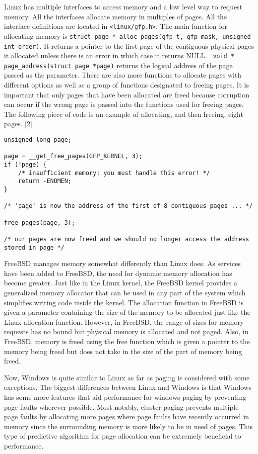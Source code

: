 \documentclass[letterpaper,10pt,onecolumn,draftclsnofoot,]{article}
\begin{document}
Linux has multiple interfaces to access memory and a low level way to request memory. All the interfaces allocate memory in multiples of pages. All the interface definitions are located in \verb|<linux/gfp.h>|. The main function for allocating memory is \verb|struct page * alloc_pages(gfp_t, gfp_mask, unsigned int order)|. It returns a pointer to the first page of the contiguous physical pages it allocated unless there is an error in which case it returns NULL. \verb| void * page_address(struct page *page)| returns the logical address of the page passed as the parameter. There are also more functions to allocate pages with different options as well as a group of functions designated to freeing pages. It is important that only pages that have been allocated are freed because corruption can occur if the wrong page is passed into the functions used for freeing pages. The following piece of code is an example of allocating, and then freeing, eight pages. [2]
\begin{lstlisting}
unsigned long page;

page = __get_free_pages(GFP_KERNEL, 3);
if (!page) {
	/* insufficient memory: you must handle this error! */
    return -ENOMEN;
}

/* 'page' is now the address of the first of 8 contiguous pages ... */

free_pages(page, 3);

/* our pages are now freed and we should no longer access the address stored in page */
\end{lstlisting}

FreeBSD manages memory somewhat differently than Linux does. As services have been added to FreeBSD, the need for dynamic memory allocation has become greater. Just like in the Linux kernel, the FreeBSD kernel provides a generalized memory allocator that can be used in any part of the system which simplifies writing code inside the kernel. The allocation function in FreeBSD is given a parameter containing the size of the memory to be allocated just like the Linux allocation function. However, in FreeBSD, the range of sizes for memory requests has no bound but physical memory is allocated and not paged. Also, in FreeBSD, memory is freed using the free function which is given a pointer to the memory being freed but does not take in the size of the part of memory being freed.

Now, Windows is quite similar to Linux as far as paging is considered with some exceptions. The biggest differences between Linux and Windows is that Windows has some more features that aid performance for windows paging by preventing page faults wherever possible. Most notably, cluster paging prevents multiple page faults by allocating more pages where page faults have recently occurred in memory since the surrounding memory is more likely to be in need of pages. This type of predictive algorithm for page allocation can be extremely beneficial to performance.
\end{document}
